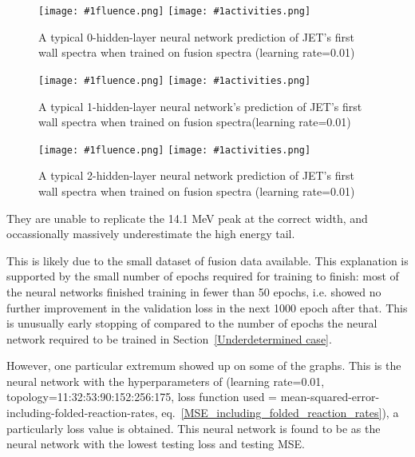\documentclass[a4paper, 12pt]{article}
\newcommand{\fluenceandactivities}[1]{
\texttt{[image: \#1fluence.png]}
\texttt{[image: \#1activities.png]}
}
\begin{document}
\begin{figure}[H]
\centering
\fluenceandactivities{/home/ocean/Documents/GitHubDir/unfolding/unfolding/unfoldingsuite/neuralnetwork/realoutputEarlyStopping/SelectedNNreplicated/fusion-fusion-final/0927_0215_0_layerfinal_inv_0_test_001_}
\caption{A typical 0-hidden-layer neural network prediction of JET's first wall spectra when trained on fusion spectra (learning rate=0.01)}
\end{figure}

\begin{figure}[H]
\centering
\fluenceandactivities{/home/ocean/Documents/GitHubDir/unfolding/unfolding/unfoldingsuite/neuralnetwork/realoutputEarlyStopping/SelectedNNreplicated/fusion-fusion-final/0927_0217_1_layerfinal_inv_1_test_001_}
\caption{A typical 1-hidden-layer neural network's prediction of JET's first wall spectra when trained on fusion spectra(learning rate=0.01)}
\end{figure}

\begin{figure}
\centering
\fluenceandactivities{/home/ocean/Documents/GitHubDir/unfolding/unfolding/unfoldingsuite/neuralnetwork/realoutputEarlyStopping/SelectedNNreplicated/fusion-fusion/0927_0219_2_layerfinal_inv_2_test_001_}
\caption{A typical 2-hidden-layer neural network prediction of JET's first wall spectra when trained on fusion spectra (learning rate=0.01)}\label{3Layerfusion-fusionJET-FW}
\end{figure}

They are unable to replicate the 14.1 MeV peak at the correct width, and occassionally massively underestimate the high energy tail.

This is likely due to the small dataset of fusion data available. This explanation is supported by the small number of epochs required for training to finish: most of the neural networks finished training in fewer than 50 epochs, i.e. showed no further improvement in the validation loss in the next 1000 epoch after that. This is unusually early stopping of compared to the number of epochs the neural network required to be trained in Section~\ref{Underdetermined case}.

However, one particular extremum showed up on some of the graphs. This is the neural network with the hyperparameters of (learning rate=0.01, topology=11:32:53:90:152:256:175, loss function used = mean-squared-error-including-folded-reaction-rates, eq.~\ref{MSE_including_folded_reaction_rates}), a particularly loss value is obtained. This neural network is found to be as the neural network with the lowest testing loss and testing MSE.
\end{document}
